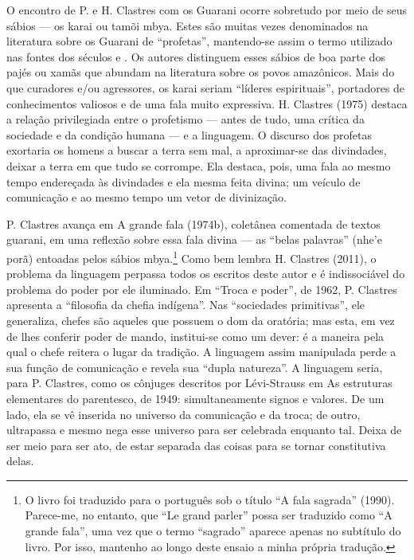 O encontro de P. e H. Clastres com os Guarani ocorre sobretudo por meio
de seus sábios --- os karai ou tamõi mbya. Estes são muitas vezes
denominados na literatura sobre os Guarani de ``profetas'', mantendo-se
assim o termo utilizado nas fontes dos séculos  e . Os autores
distinguem esses sábios de boa parte dos pajés ou xamãs que abundam na
literatura sobre os povos amazônicos. Mais do que curadores e/ou
agressores, os karai seriam ``líderes espirituais'', portadores de
conhecimentos valiosos e de uma fala muito expressiva. H. Clastres
(1975) destaca a relação privilegiada entre o profetismo --- antes de
tudo, uma crítica da sociedade e da condição humana --- e a linguagem. O
discurso dos profetas exortaria os homens a buscar a terra sem mal, a
aproximar-se das divindades, deixar a terra em que tudo se corrompe.
Ela destaca, pois, uma fala ao mesmo tempo endereçada às divindades e
ela mesma feita divina; um veículo de comunicação e ao mesmo tempo um
vetor de divinização.

P. Clastres avança em A grande fala (1974b), coletânea comentada de
textos guarani, em uma reflexão sobre essa fala divina --- as ``belas
palavras'' (nhe’e porã) entoadas pelos sábios mbya.\footnote{O livro foi
traduzido para o português sob o título ``A fala sagrada'' (1990).
Parece-me, no entanto, que ``Le grand parler'' possa ser traduzido como
``A grande fala'', uma vez que o termo ``sagrado'' aparece apenas no
subtítulo do livro. Por isso, mantenho ao longo deste ensaio a minha
própria tradução.} Como bem lembra H. Clastres (2011), o problema da
linguagem perpassa todos os escritos deste autor e é indissociável do
problema do poder por ele iluminado. Em ``Troca e poder'', de 1962, P.
Clastres apresenta a ``filosofia da chefia indígena''. Nas ``sociedades
primitivas'', ele generaliza, chefes são aqueles que possuem o dom da
oratória; mas esta, em vez de lhes conferir poder de mando, institui-se
como um dever: é a maneira pela qual o chefe reitera o lugar da
tradição. A linguagem assim manipulada perde a sua função de
comunicação e revela sua ``dupla natureza''. A linguagem seria, para P.
Clastres, como os cônjuges descritos por Lévi-Strauss em As estruturas
elementares do parentesco, de 1949: simultaneamente signos e valores.
De um lado, ela se vê inserida no universo da comunicação e da troca;
de outro, ultrapassa e mesmo nega esse universo para ser celebrada
enquanto tal. Deixa de ser meio para ser ato, de estar separada das
coisas para se tornar constitutiva delas. 

